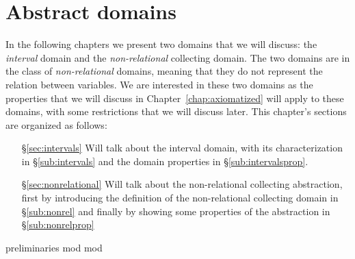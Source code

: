 \chapter{Abstract domains}
\label{chap:abstractdomains}


In the following chapters we present two domains that we will discuss:
the \emph{interval} domain and the \emph{non-relational} collecting
domain. The two domains are in the class of \emph{non-relational}
domains, meaning that they do not represent the relation between
variables.  We are interested in these two domains as the
properties that we will discuss in Chapter~\ref{chap:axiomatized} will
apply to these domains, with some restrictions that we will discuss
later.  This chapter's sections are organized as follows:

\begin{itemize}
\item[\S\ref{sec:intervals}] Will talk about the interval domain, with
  its characterization in \S\ref{sub:intervals} and the domain
  properties in \S\ref{sub:intervalsprop}.
\item[\S\ref{sec:nonrelational}] Will talk about the non-relational
  collecting abstraction, first by introducing the definition of the
  non-relational collecting domain in \S\ref{sub:nonrel} and finally
  by showing some properties of the abstraction in
  \S\ref{sub:nonrelprop}
\end{itemize}

{preliminaries}
{mod}
{mod}

